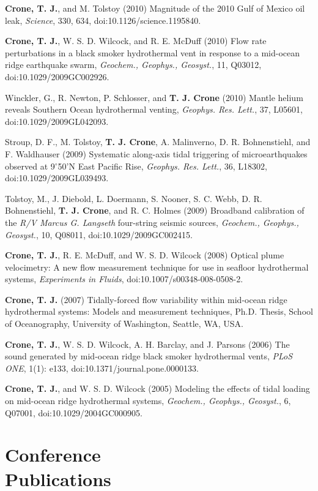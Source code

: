 \documentclass[11pt]{res}
\begin{document}
\begin{resume}
{\bf Crone, T. J.}, and M. Tolstoy (2010) Magnitude of the 2010 Gulf of Mexico oil leak, {\em Science}, 330, 634, doi:10.1126/science.1195840.

{\bf Crone, T. J.}, W. S. D. Wilcock, and R. E. McDuff (2010) Flow rate perturbations in a black smoker hydrothermal vent in response to a mid-ocean ridge earthquake swarm, {\em Geochem., Geophys., Geosyst.}, 11, Q03012, doi:10.1029/2009GC002926.

Winckler, G., R. Newton, P. Schlosser, and {\bf T. J. Crone} (2010) Mantle helium reveals Southern Ocean hydrothermal venting, {\em Geophys. Res. Lett.}, 37, L05601, doi:10.1029/2009GL042093.

Stroup, D. F., M. Tolstoy, {\bf T. J. Crone}, A. Malinverno, D. R. Bohnenstiehl, and F. Waldhauser (2009) Systematic along-axis tidal triggering of microearthquakes observed at 9$^\circ$50'N East Pacific Rise, {\em Geophys. Res. Lett.}, 36, L18302, doi:10.1029/2009GL039493.

Tolstoy, M., J. Diebold, L. Doermann, S. Nooner, S. C. Webb, D. R. Bohnenstiehl, {\bf T. J. Crone}, and R. C. Holmes (2009) Broadband calibration of the {\em R/V Marcus G. Langseth} four-string seismic sources, {\em Geochem., Geophys., Geosyst.}, 10, Q08011, doi:10.1029/2009GC002415.

{\bf Crone, T. J.}, R. E. McDuff, and W. S. D. Wilcock (2008) Optical plume velocimetry: A new flow measurement technique for use in seafloor hydrothermal systems, {\em Experiments in Fluids}, doi:10.1007/s00348-008-0508-2.

{\bf Crone, T. J.} (2007) Tidally-forced flow variability within mid-ocean ridge hydrothermal systems: Models and measurement techniques, Ph.D. Thesis, School of Oceanography, University of Washington, Seattle, WA, USA.

{\bf Crone, T. J.}, W. S. D. Wilcock, A. H. Barclay, and J. Parsons (2006) The sound generated by mid-ocean ridge black smoker hydrothermal vents, {\em PLoS ONE}, 1(1): e133, doi:10.1371/journal.pone.0000133.

{\bf Crone, T. J.}, and W. S. D. Wilcock (2005) Modeling the effects of tidal loading on mid-ocean ridge hydrothermal systems, {\em Geochem., Geophys., Geosyst.}, 6, Q07001, doi:10.1029/2004GC000905.

\section{\sc Conference\\Publications}


\end{resume}
\end{document}
